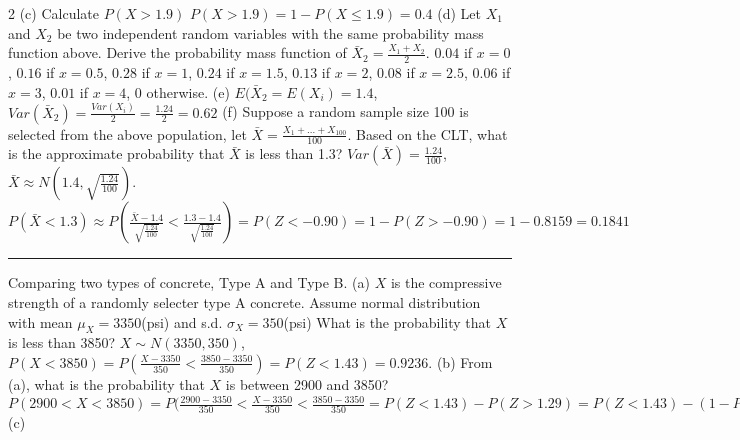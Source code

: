 \documentclass[9pt]{article}
\newcommand*\mean[1]{\bar{#1}}
\begin{document}
\begin{multicols*}{2}
    (c) Calculate $P(X>1.9)$
    $P(X>1.9) = 1-P(X\leq 1.9) = 0.4$\newline
    (d) Let $X_1$ and $X_2$ be two independent random variables with the same probability mass function above. Derive the probability mass function of $\mean{X}_2=\frac{X_1+X_2}{2}$.
    $0.04$ if $x=0$, $0.16$ if $x=0.5$, $0.28$ if $x=1$, $0.24$ if $x=1.5$, $0.13$ if $x=2$, $0.08$ if $x=2.5$, $0.06$ if $x=3$, $0.01$ if $x=4$, 0 otherwise.\newline
    (e) $E(\mean{X}_2=E(X_i)=1.4$, $Var(\mean{X}_2)=\frac{Var(X_i)}{2}=\frac{1.24}{2}=0.62$\newline
    (f) Suppose a random sample size 100 is selected from the above population, let $\mean{X}=\frac{X_1+...+X_100}{100}$.
    Based on the CLT, what is the approximate probability that $\mean{X}$ is less than 1.3?
    $Var(\mean{X})=\frac{1.24}{100}$, $\mean{X}\approx N(1.4,\sqrt{\frac{1.24}{100}})$. $P(\mean{X} < 1.3) \approx P(\frac{\mean{X}-1.4}{\sqrt{\frac{1.24}{100}}} < \frac{1.3-1.4}{\sqrt{\frac{1.24}{100}}}) = P(Z<-0.90) = 1-P(Z>-0.90) = 1-0.8159=0.1841$
    \rule{0.5\textwidth}{0.4pt}
    Comparing two types of concrete, Type A and Type B.\newline
    (a) $X$ is the compressive strength of a randomly selecter type A concrete. Assume normal distribution with mean $\mu_X = 3350$(psi) and s.d. $\sigma_X=350$(psi)
    What is the probability that $X$ is less than 3850? $X\sim N(3350, 350)$, $P(X<3850) = P(\frac{X-3350}{350} < \frac{3850-3350}{350}) = P(Z < 1.43) = 0.9236$.\newline
    (b) From (a), what is the probability that $X$ is between 2900 and 3850?
    $P(2900 < X < 3850) = P(\frac{2900-3350}{350}<\frac{X-3350}{350}<\frac{3850-3350}{350} = P(Z<1.43) - P(Z>1.29) = P(Z<1.43) - (1 - P(Z < 1.29)) = 0.9236 - (1-0.9015) = 0.8251$\newline
    (c)
\end{multicols*}
\end{document}
